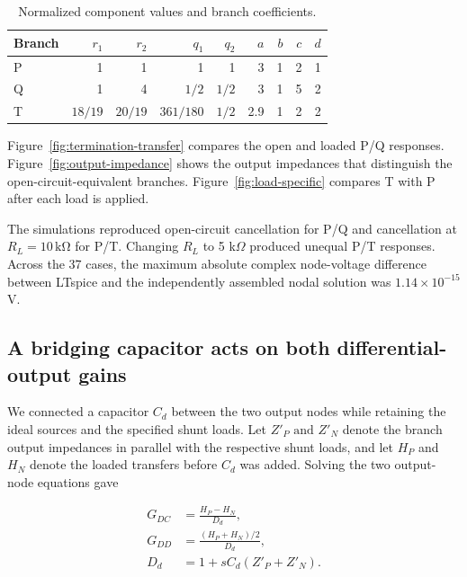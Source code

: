 \begin{table}[htbp]
\centering
\caption{Normalized component values and branch coefficients.}
\label{tab:branches}
\begin{tabular}{lrrrrrrrr}
\toprule
Branch & $r_1$ & $r_2$ & $q_1$ & $q_2$ & $a$ & $b$ & $c$ & $d$ \\
\midrule
P & 1 & 1 & 1 & 1 & 3 & 1 & 2 & 1 \\
Q & 1 & 4 & $1/2$ & $1/2$ & 3 & 1 & 5 & 2 \\
T & $18/19$ & $20/19$ & $361/180$ & $1/2$ & 2.9 & 1 & 2 & 2 \\
\bottomrule
\end{tabular}
\end{table}

Figure~\ref{fig:termination-transfer} compares the open and loaded P/Q responses. Figure~\ref{fig:output-impedance} shows the output impedances that distinguish the open-circuit-equivalent branches. Figure~\ref{fig:load-specific} compares T with P after each load is applied.



The simulations reproduced open-circuit cancellation for P/Q and cancellation at \(R_L=10\,\mathrm{k\Omega}\) for P/T. Changing \(R_L\) to 5 k\(\Omega\) produced unequal P/T responses. Across the 37 cases, the maximum absolute complex node-voltage difference between LTspice and the independently assembled nodal solution was \(1.14\times10^{-15}\) V.





\subsection{A bridging capacitor acts on both differential-output gains}

We connected a capacitor \(C_d\) between the two output nodes while retaining the ideal sources and the specified shunt loads. Let \(Z'_P\text{ and }Z'_N\) denote the branch output impedances in parallel with the respective shunt loads, and let \(H_P\) and \(H_N\) denote the loaded transfers before \(C_d\) was added. Solving the two output-node equations gave

\begin{equation}\label{eq:12}
\begin{aligned}
G_{DC}&=\frac{H_P-H_N}{D_d},\\
G_{DD}&=\frac{(H_P+H_N)/2}{D_d},\\
D_d&=1+sC_d(Z'_P+Z'_N).
\end{aligned}
\end{equation}

